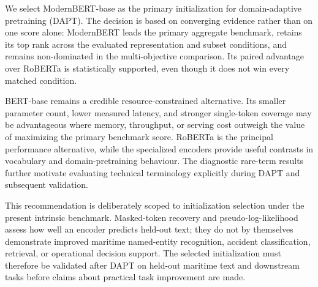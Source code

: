 We select ModernBERT-base as the primary initialization for domain-adaptive pretraining (DAPT). The decision is based on converging evidence rather than on one score alone: ModernBERT leads the primary aggregate benchmark, retains its top rank across the evaluated representation and subset conditions, and remains non-dominated in the multi-objective comparison. Its paired advantage over RoBERTa is statistically supported, even though it does not win every matched condition.

BERT-base remains a credible resource-constrained alternative. Its smaller parameter count, lower measured latency, and stronger single-token coverage may be advantageous where memory, throughput, or serving cost outweigh the value of maximizing the primary benchmark score. RoBERTa is the principal performance alternative, while the specialized encoders provide useful contrasts in vocabulary and domain-pretraining behaviour. The diagnostic rare-term results further motivate evaluating technical terminology explicitly during DAPT and subsequent validation.

This recommendation is deliberately scoped to initialization selection under the present intrinsic benchmark. Masked-token recovery and pseudo-log-likelihood assess how well an encoder predicts held-out text; they do not by themselves demonstrate improved maritime named-entity recognition, accident classification, retrieval, or operational decision support. The selected initialization must therefore be validated after DAPT on held-out maritime text and downstream tasks before claims about practical task improvement are made.
